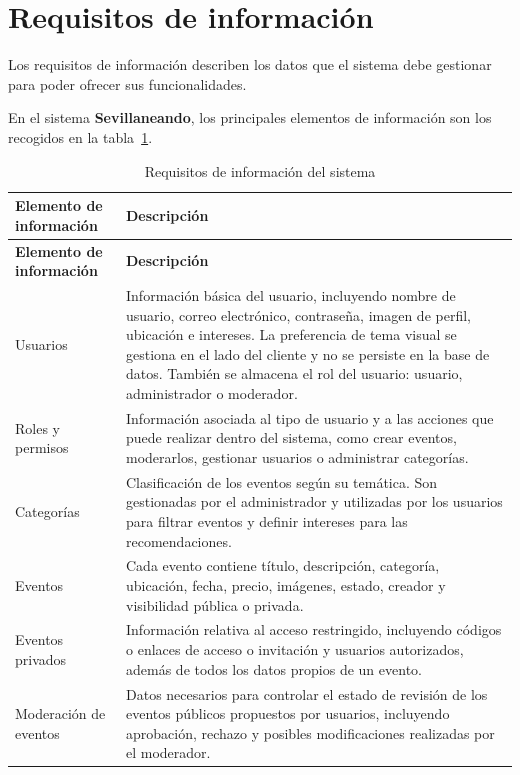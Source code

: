 \section{Requisitos de información}

Los requisitos de información describen los datos que el sistema debe gestionar para poder ofrecer sus funcionalidades.

En el sistema \textbf{Sevillaneando}, los principales elementos de información son los recogidos en la tabla~\ref{tab:requisitos_informacion}.

{\renewcommand{\arraystretch}{1.18}
\begin{longtable}{@{}>{\raggedright\arraybackslash}p{} >{\raggedright\arraybackslash}p{}@{}}
\caption{Requisitos de información del sistema}
\label{tab:requisitos_informacion}\\
\toprule
\textbf{Elemento de información} & \textbf{Descripción} \\
\midrule
\endfirsthead
\toprule
\textbf{Elemento de información} & \textbf{Descripción} \\
\midrule
\endhead
\bottomrule
\endfoot
Usuarios & Información básica del usuario, incluyendo nombre de usuario, correo electrónico, contraseña, imagen de perfil, ubicación e intereses. La preferencia de tema visual se gestiona en el lado del cliente y no se persiste en la base de datos. También se almacena el rol del usuario: usuario, administrador o moderador. \\
Roles y permisos & Información asociada al tipo de usuario y a las acciones que puede realizar dentro del sistema, como crear eventos, moderarlos, gestionar usuarios o administrar categorías. \\
Categorías & Clasificación de los eventos según su temática. Son gestionadas por el administrador y utilizadas por los usuarios para filtrar eventos y definir intereses para las recomendaciones. \\
Eventos & Cada evento contiene título, descripción, categoría, ubicación, fecha, precio, imágenes, estado, creador y visibilidad pública o privada. \\
Eventos privados & Información relativa al acceso restringido, incluyendo códigos o enlaces de acceso o invitación y usuarios autorizados, además de todos los datos propios de un evento. \\
Moderación de eventos & Datos necesarios para controlar el estado de revisión de los eventos públicos propuestos por usuarios, incluyendo aprobación, rechazo y posibles modificaciones realizadas por el moderador. \\

\end{longtable}}
